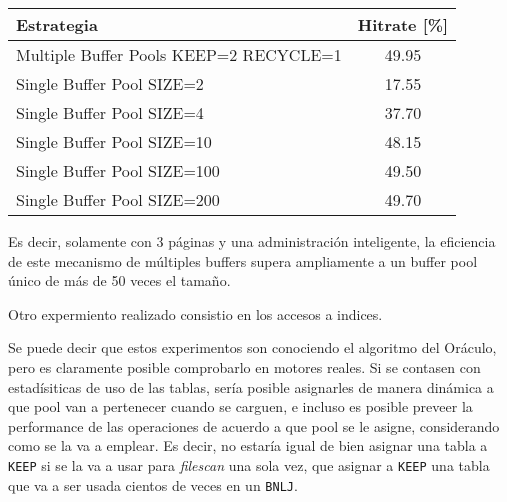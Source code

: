 \begin{table}[H]\centering
    \begin{tabular}{l || c}
    \large{\textbf{Estrategia}}                             & \large{\textbf{Hitrate}} [\%] \\
    \hline
    Multiple Buffer Pools KEEP=2 RECYCLE=1 & 49.95       \\
    Single Buffer Pool SIZE=2              & 17.55       \\
    Single Buffer Pool SIZE=4              & 37.70       \\
    Single Buffer Pool SIZE=10             & 48.15       \\
    Single Buffer Pool SIZE=100            & 49.50       \\
    Single Buffer Pool SIZE=200            & 49.70       \\
    \end{tabular}
\end{table}

Es decir, solamente con 3 p\'aginas y una administraci\'on inteligente, la eficiencia
de este mecanismo de m\'ultiples buffers supera ampliamente a un buffer pool \'unico de
m\'as de 50 veces el tama\~no.

Otro expermiento realizado consistio en los accesos a indices.

Se puede decir que estos experimentos son conociendo el algoritmo del Or\'aculo,
pero es claramente posible comprobarlo en motores reales. Si se contasen
con estadísiticas de uso de las tablas, sería posible asignarles de manera
din\'amica a que pool van a pertenecer cuando se carguen, e incluso es
posible preveer la performance de las operaciones de acuerdo a que pool
se le asigne, considerando como se la va a emplear. Es decir, no estaría
igual de bien asignar una tabla a \texttt{KEEP} si se la va a usar para \textit{filescan}
una sola vez, que asignar a \texttt{KEEP} una tabla que va a ser usada cientos de veces
en un \texttt{BNLJ}.
